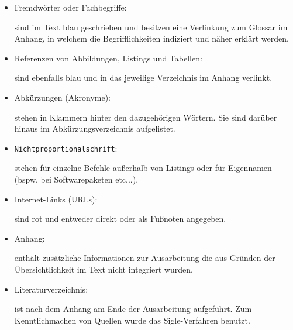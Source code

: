 \begin{itemize}
  \item Fremdwörter oder Fachbegriffe:

sind im Text blau geschrieben und besitzen eine Verlinkung zum Glossar im Anhang, in welchem die Begrifflichkeiten indiziert und näher erklärt werden.

  \item Referenzen von Abbildungen, Listings und Tabellen:
  
sind ebenfalls blau und in das jeweilige Verzeichnis im Anhang verlinkt. 


  \item Abkürzungen (Akronyme):

stehen in Klammern hinter den dazugehörigen Wörtern. Sie sind darüber hinaus im Abkürzungsverzeichnis aufgelistet.

  \item \texttt{Nichtproportionalschrift}:

stehen für einzelne Befehle außerhalb von Listings oder für Eigennamen (bspw. bei Softwarepaketen etc...).

  \item Internet-Links (URLs):

sind rot und entweder direkt oder als Fußnoten angegeben.

  \item Anhang:

enthält zusätzliche Informationen zur Ausarbeitung die aus Gründen der Übersichtlichkeit im Text nicht integriert wurden. 

  \item Literaturverzeichnis:

ist nach dem Anhang am Ende der Ausarbeitung aufgeführt. Zum Kenntlichmachen von Quellen wurde das Sigle-Verfahren benutzt.

\end{itemize}
